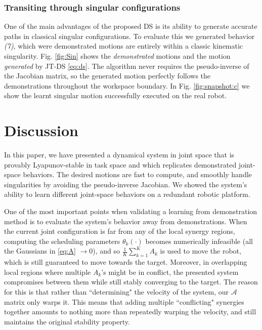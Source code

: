 \documentclass[letterpaper, 10 pt, conference,fleqn]{ieeeconf}
\begin{document}
\subsubsection{Transiting through singular configurations}
One of the main advantages of the proposed DS is its ability to generate accurate paths in classical singular configurations. To evaluate this we generated behavior \textit{(7)}, which were demonstrated motions are entirely within a classic kinematic singularity. Fig. \ref{fig:Sin} shows the \textit{demonstrated} motions and the motion  \textit{generated} by JT-DS \eqref{eq:ds}. The algorithm never requires the pseudo-inverse of the Jacobian matrix, so the generated motion perfectly follows the demonstrations throughout the workspace boundary. In Fig. \ref{fig:snapshot:c} we show the learnt singular motion successfully  executed on the real robot.

\section{Discussion} 
\label{Sec:Dis}
In this paper, we have presented a dynamical system in joint space that is provably Lyapunov-stable in task space and which replicates demonstrated joint-space behaviors. The desired motions are fast to compute, and smoothly handle singularities by avoiding the pseudo-inverse Jacobian. We showed the system's ability to learn different joint-space behaviors on a redundant robotic platform.

One of the most important points when validating a learning from demonstration method is to evaluate the system's behavior away from demonstrations. When the current joint configuration is far from any of the local synergy regions, computing the scheduling parameters $\theta_k(\cdot)$ becomes numerically infeasible (all the Gaussians in \eqref{eq:A} $\rightarrow 0$), and so $\frac{1}{K}\sum\limits_{k=1}^{K}A_k$ is used to move the robot, which is still guaranteed to move towards the target. Moreover, in overlapping local regions where multiple $A_k$'s might be in conflict, the presented system compromises between them while still stably converging to the target. The reason for this is that rather than ``determining" the velocity of the system, our $\mathcal{A}$ matrix only warps it. This means that adding multiple ``conflicting" synergies together amounts to nothing more than repeatedly warping the velocity, and still maintains the original stability property. 

\end{document}
